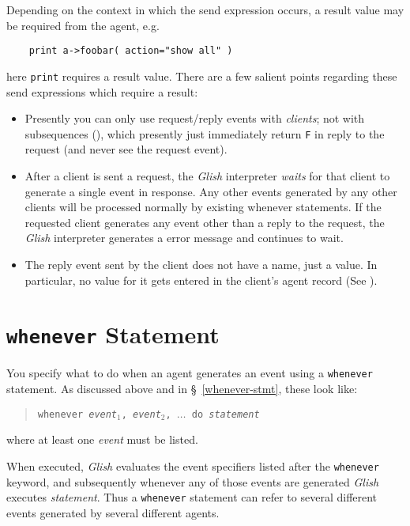 Depending on the context in which  the send expression occurs, a result
value may be required from the agent, e.g.
\begin{verbatim}
    print a->foobar( action="show all" )
\end{verbatim}
here {\tt print} requires a result value. There are a few salient points
regarding these send expressions which require a result:
\begin{itemize}
\item Presently you can only use request/reply events with {\em clients};
not with subsequences (), which presently just immediately
return {\tt F} in reply to the request (and never see the request event).

\item After a client is sent a request, the {\em Glish} interpreter 
{\em waits}
for that client to generate a single event in response.  Any other
events generated by any other clients will be processed
normally by existing whenever statements.  If the requested client
generates any event other than a reply to the request, the {\em Glish}
interpreter generates a error message and continues to wait.

\item The reply event sent by the client does not have a name, just a
value.  In particular, no value for it gets entered in the client's
agent record (See ).
\end{itemize}


\section{{\tt whenever} Statement}
\label{whenever}

You specify what to do when an agent generates an event using
a {\tt whenever} statement.  As discussed above and in
\S~\ref{whenever-stmt}, these look like:
\begin{quote}
    {\tt whenever {\em event$_1$}, {\em event$_2$}, $\ldots$ do {\em statement}}
\end{quote}
where at least one {\em event} must be listed.

When executed, {\em Glish} evaluates the event specifiers listed after the
{\tt whenever} keyword, and subsequently whenever any of those events
are generated {\em Glish} executes {\em statement\/}.  Thus a {\tt whenever} statement
can refer to several different events generated by several 
different agents.

